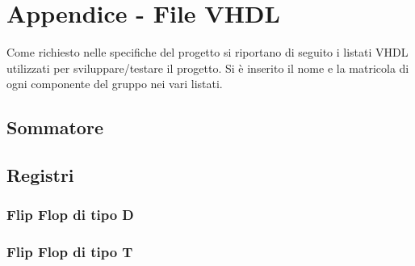 \section{Appendice - File VHDL}
\label{cap: Appendice}

\noindent Come richiesto nelle specifiche del progetto si riportano di seguito i listati VHDL utilizzati per sviluppare/testare
il progetto.
Si è inserito il nome e la matricola di ogni componente del gruppo nei vari listati.


%

\subsection{Sommatore}

% 



\subsection{Registri}
\subsubsection{Flip Flop di tipo D}



\subsubsection{Flip Flop di tipo T}


